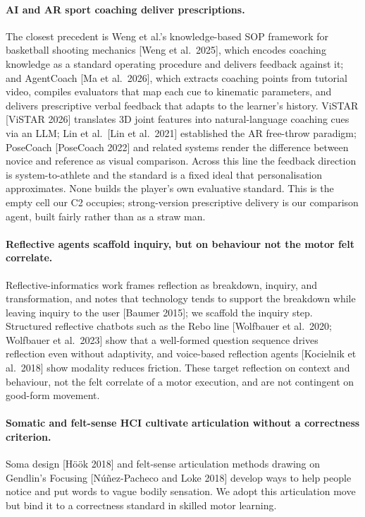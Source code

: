 \documentclass[sigconf]{acmart}
\begin{document}
\paragraph{AI and AR sport coaching deliver prescriptions.} The closest precedent is Weng et al.'s knowledge-based SOP framework for basketball shooting mechanics [Weng et al.\ 2025], which encodes coaching knowledge as a standard operating procedure and delivers feedback against it; and AgentCoach [Ma et al.\ 2026], which extracts coaching points from tutorial video, compiles evaluators that map each cue to kinematic parameters, and delivers prescriptive verbal feedback that adapts to the learner's history. ViSTAR [ViSTAR 2026] translates 3D joint features into natural-language coaching cues via an LLM; Lin et al.\ [Lin et al.\ 2021] established the AR free-throw paradigm; PoseCoach [PoseCoach 2022] and related systems render the difference between novice and reference as visual comparison. Across this line the feedback direction is system-to-athlete and the standard is a fixed ideal that personalisation approximates. None builds the player's own evaluative standard. This is the empty cell our C2 occupies; strong-version prescriptive delivery is our comparison agent, built fairly rather than as a straw man.

\paragraph{Reflective agents scaffold inquiry, but on behaviour not the motor felt correlate.} Reflective-informatics work frames reflection as breakdown, inquiry, and transformation, and notes that technology tends to support the breakdown while leaving inquiry to the user [Baumer 2015]; we scaffold the inquiry step. Structured reflective chatbots such as the Rebo line [Wolfbauer et al.\ 2020; Wolfbauer et al.\ 2023] show that a well-formed question sequence drives reflection even without adaptivity, and voice-based reflection agents [Kocielnik et al.\ 2018] show modality reduces friction. These target reflection on context and behaviour, not the felt correlate of a motor execution, and are not contingent on good-form movement.

\paragraph{Somatic and felt-sense HCI cultivate articulation without a correctness criterion.} Soma design [Höök 2018] and felt-sense articulation methods drawing on Gendlin's Focusing [Núñez-Pacheco and Loke 2018] develop ways to help people notice and put words to vague bodily sensation. We adopt this articulation move but bind it to a correctness standard in skilled motor learning.
\end{document}
